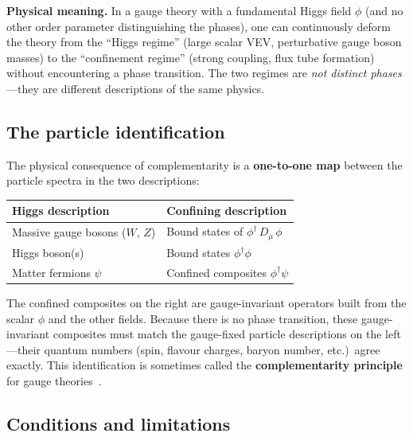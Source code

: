 \documentclass[11pt,a4paper]{article}
\begin{document}
\textbf{Physical meaning.}  In a gauge theory with a fundamental
Higgs field $\phi$ (and no other order parameter distinguishing the
phases), one can continuously deform the theory from the
``Higgs regime'' (large scalar VEV, perturbative gauge boson masses)
to the ``confinement regime'' (strong coupling, flux tube formation)
without encountering a phase transition.  The two regimes are
\emph{not distinct phases}---they are different descriptions of the
same physics.

\subsection{The particle identification}

The physical consequence of complementarity is a \textbf{one-to-one
map} between the particle spectra in the two descriptions:

\renewcommand{\arraystretch}{1.4}
\begin{center}
\begin{tabular}{l l}
\toprule
\textbf{Higgs description} & \textbf{Confining description} \\
\midrule
Massive gauge bosons ($W$, $Z$) & Bound states of $\phi^\dagger\, D_\mu\, \phi$ \\
Higgs boson(s) & Bound states $\phi^\dagger \phi$ \\
Matter fermions $\psi$ & Confined composites $\phi^\dagger \psi$ \\
\bottomrule
\end{tabular}
\end{center}

The confined composites on the right are gauge-invariant operators
built from the scalar $\phi$ and the other fields.  Because there is
no phase transition, these gauge-invariant composites must match the
gauge-fixed particle descriptions on the left---their quantum numbers
(spin, flavour charges, baryon number, etc.)\ agree exactly.  This
identification is sometimes called the \textbf{complementarity
principle} for gauge theories~\cite{FS1979,AbbottFarhi1981}.

\subsection{Conditions and limitations}
\end{document}
